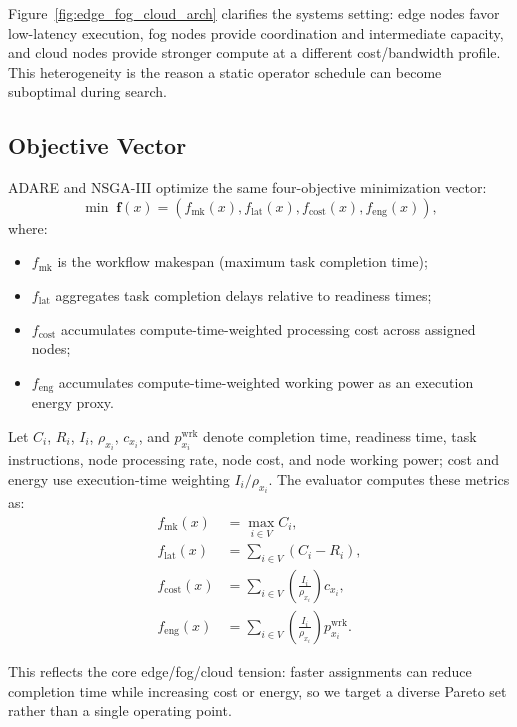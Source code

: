 \documentclass[runningheads]{llncs}
\begin{document}
Figure~\ref{fig:edge_fog_cloud_arch} clarifies the systems setting: edge nodes favor low-latency execution, fog nodes provide coordination and intermediate capacity, and cloud nodes provide stronger compute at a different cost/bandwidth profile. This heterogeneity is the reason a static operator schedule can become suboptimal during search.

\subsection{Objective Vector}
ADARE and NSGA-III optimize the same four-objective minimization vector:
\begin{equation}
\min \; \mathbf{f}(x) = \left(f_{\mathrm{mk}}(x), f_{\mathrm{lat}}(x), f_{\mathrm{cost}}(x), f_{\mathrm{eng}}(x)\right),
\end{equation}
where:
\begin{itemize}
    \item $f_{\mathrm{mk}}$ is the workflow makespan (maximum task completion time);
    \item $f_{\mathrm{lat}}$ aggregates task completion delays relative to readiness times;
    \item $f_{\mathrm{cost}}$ accumulates compute-time-weighted processing cost across assigned nodes;
    \item $f_{\mathrm{eng}}$ accumulates compute-time-weighted working power as an execution energy proxy.
\end{itemize}
Let $C_i$, $R_i$, $I_i$, $\rho_{x_i}$, $c_{x_i}$, and $p^{\mathrm{wrk}}_{x_i}$ denote completion time, readiness time, task instructions, node processing rate, node cost, and node working power; cost and energy use execution-time weighting $I_i / \rho_{x_i}$.
The evaluator computes these metrics as:
\begin{equation}
\label{eq:objective_metrics}
\begin{aligned}
f_{\mathrm{mk}}(x) &= \max_{i \in V} C_i, \\
f_{\mathrm{lat}}(x) &= \sum_{i \in V} \left(C_i - R_i\right), \\
f_{\mathrm{cost}}(x) &= \sum_{i \in V} \left(\frac{I_i}{\rho_{x_i}}\right) c_{x_i}, \\
f_{\mathrm{eng}}(x) &= \sum_{i \in V} \left(\frac{I_i}{\rho_{x_i}}\right) p^{\mathrm{wrk}}_{x_i}.
\end{aligned}
\end{equation}

This reflects the core edge/fog/cloud tension: faster assignments can reduce completion time while increasing cost or energy, so we target a diverse Pareto set rather than a single operating point.
\end{document}
